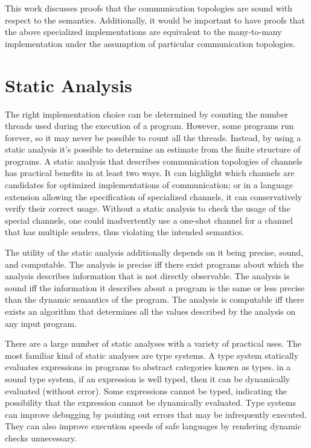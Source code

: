 \documentclass[10pt]{article}
\begin{document}
This work discusses proofs that the communication topologies are sound with respect to the
semantics. Additionally, it would be important to have proofs that the above specialized
implementations are equivalent to the many-to-many implementation under the assumption of
particular communication topologies.

\section{Static Analysis}
The right implementation choice can be determined by counting the number threads used during
the execution of a program. However, some programs run forever, so it may never be possible to
count all the threads. Instead, by using a static analysis it's possible to determine an
estimate from the finite structure of programs. A static analysis that describes communication
topologies of channels has practical benefits in at least two ways.  It can highlight which
channels are candidates for optimized implementations of communication; or in a language
extension allowing the specification of specialized channels, it can conservatively verify
their correct usage. Without a static analysis to check the usage of the special channels, one
could inadvertently use a one-shot channel for a channel that has multiple senders, thus
violating the intended semantics. 

The utility of the static analysis additionally depends on it being precise, sound, and
computable. The analysis is precise iff there exist programs about which the analysis
describes information that is not directly observable. The analysis is sound iff the
information it describes about a program is the same or less precise than the dynamic
semantics of the program. The analysis is computable iff there exists an algorithm that
determines all the values described by the analysis on any input program.

There are a large number of static analyses with a variety of practical uses. The most familiar
kind of static analyses are type systems.  A type system statically evaluates expressions
in programs to abstract categories known as types. in a sound type system, if an expression is
well typed, then it can be dynamically evaluated (without error). Some expressions cannot be
typed, indicating the possibility that the expression cannot be dynamically evaluated. Type
systems can improve debugging by pointing out errors that may be infrequently executed. They
can also improve execution speeds of safe languages by rendering dynamic checks unnecessary.  
\end{document}
